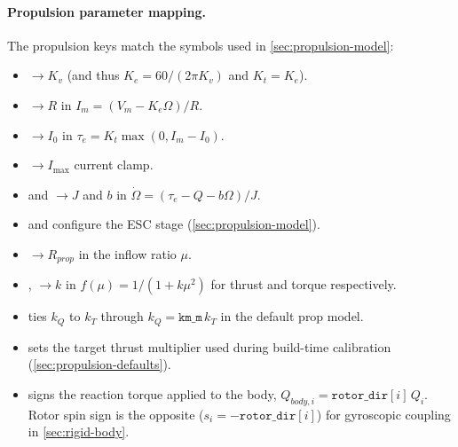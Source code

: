 \paragraph{Propulsion parameter mapping.}
The propulsion keys match the symbols used in \cref{sec:propulsion-model}:
\begin{itemize}[leftmargin=*,itemsep=2pt]
  \item {} \(\rightarrow K_v\) (and thus \(K_e=60/(2\pi K_v)\) and \(K_t=K_e\)).
  \item {} \(\rightarrow R\) in \(I_m=(V_m-K_e\Omega)/R\).
  \item {} \(\rightarrow I_0\) in \(\tau_e=K_t\max(0,I_m-I_0)\).
  \item {} \(\rightarrow I_{\max}\) current clamp.
  \item {} and  \(\rightarrow J\) and \(b\) in \(\dot{\Omega}=(\tau_e-Q-b\Omega)/J\).
  \item {} and  configure the ESC stage (\cref{sec:propulsion-model}).
  \item {} \(\rightarrow R_{prop}\) in the inflow ratio \(\mu\).
  \item {},  \(\rightarrow k\) in \(f(\mu)=1/(1+k\mu^2)\) for thrust and torque respectively.
  \item {} ties \(k_Q\) to \(k_T\) through \(k_Q=\texttt{km\_m}\,k_T\) in the default prop model.
  \item {} sets the target thrust multiplier used during build-time calibration (\cref{sec:propulsion-defaults}).
  \item {} signs the reaction torque applied to the body, \(Q_{body,i}=\texttt{rotor\_dir}[i]\,Q_i\). Rotor spin sign is the opposite (\(s_i=-\texttt{rotor\_dir}[i]\)) for gyroscopic coupling in \cref{sec:rigid-body}.
\end{itemize}
